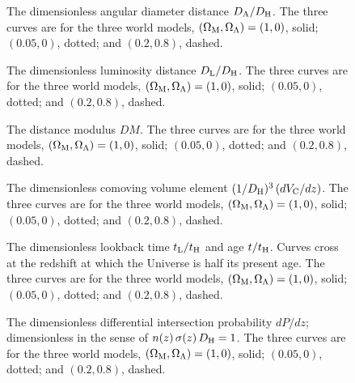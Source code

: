 \begin{figure}
\caption[The dimensionless angular diameter distance $D_{\rm A}/D_{\rm
H}$.]{ The dimensionless angular diameter distance $D_{\rm A}/D_{\rm
H}$.  The three curves are for the three world models, $(\Omega_{\rm
M},\Omega_{\Lambda})=(1,0)$, solid; $(0.05,0)$, dotted; and
$(0.2,0.8)$, dashed.}
\label{angdidis}
\end{figure}

\begin{figure}
\caption[The dimensionless luminosity distance $D_{\rm L}/D_{\rm
H}$.]{ The dimensionless luminosity distance $D_{\rm L}/D_{\rm H}$.
The three curves are for the three world models, $(\Omega_{\rm
M},\Omega_{\Lambda})=(1,0)$, solid; $(0.05,0)$, dotted; and
$(0.2,0.8)$, dashed.}
\label{lumdis}
\end{figure}

\begin{figure}
\caption[The distance modulus $DM$.]{ The distance modulus $DM$.  The
three curves are for the three world models, $(\Omega_{\rm
M},\Omega_{\Lambda})=(1,0)$, solid; $(0.05,0)$, dotted; and
$(0.2,0.8)$, dashed.}
\label{distmod}
\end{figure}

\begin{figure}
\caption[The dimensionless comoving volume element $(1/D_{\rm
H})^3\,(dV_{\rm C}/dz)$.]{ The dimensionless comoving volume element
$(1/D_{\rm H})^3\,(dV_{\rm C}/dz)$.  The three curves are for the
three world models, $(\Omega_{\rm M},\Omega_{\Lambda})=(1,0)$, solid;
$(0.05,0)$, dotted; and $(0.2,0.8)$, dashed.}
\label{dcomvoldz}
\end{figure}

\begin{figure}
\caption[The dimensionless lookback time $t_{\rm L}/t_{\rm H}$ and age
$t/t_{\rm H}$.]{The dimensionless lookback time $t_{\rm L}/t_{\rm H}$
and age $t/t_{\rm H}$.  Curves cross at the redshift at which the
Universe is half its present age.  The three curves are for the three
world models, $(\Omega_{\rm M},\Omega_{\Lambda})=(1,0)$, solid;
$(0.05,0)$, dotted; and $(0.2,0.8)$, dashed.}
\label{lookback}
\end{figure}

\begin{figure}
\caption[The dimensionless differential intersection probability
$dP/dz$.]{ The dimensionless differential intersection probability
$dP/dz$; dimensionless in the sense of $n(z)\,\sigma(z)\,D_{\rm H}=1$.
The three curves are for the three world models, $(\Omega_{\rm
M},\Omega_{\Lambda})=(1,0)$, solid; $(0.05,0)$, dotted; and
$(0.2,0.8)$, dashed.}
\label{doptdepthdz}
\end{figure}


